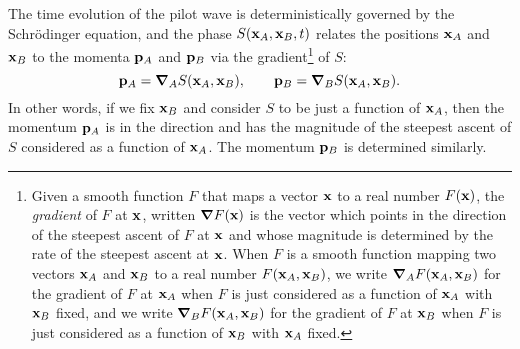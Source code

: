 The time evolution of the pilot wave is deterministically governed by the Schr\"{o}dinger equation, and the phase $S(\vb{x}_A, \vb{x}_B, t )$ relates the positions $\vb{x}_A$ and $\vb{x}_B$ to the momenta $\vb{p}_A$ and $\vb{p}_B$ via the gradient\footnote{Given a smooth function $F$ that maps a vector $\vb{x}$ to a real number $F(\vb{x})$, the \emph{gradient} of $F$ at $\vb{x}$, written $\grad F(\vb{x})$ is the vector which points in the direction of the steepest ascent of $F$ at $\vb{x}$ and whose magnitude is determined by the rate of the steepest ascent at $\vb{x}$. When $F$ is a smooth function mapping two vectors $\vb{x}_A$ and $\vb{x}_B$ to a real number $F(\vb{x}_A, \vb{x}_B)$, we write $\grad_A F(\vb{x}_A, \vb{x}_B)$ for the gradient of $F$ at $\vb{x}_A$ when $F$ is just considered as a function of $\vb{x}_A$ with $\vb{x}_B$ fixed, and we write $\grad_B F(\vb{x}_A, \vb{x}_B)$ for the gradient of $F$ at $\vb{x}_B$ when $F$ is just considered as a function of $\vb{x}_B$ with $\vb{x}_A$ fixed.} of $S$:
\begin{equation}
\vb{p}_A=\grad_A{S}(\vb{x}_A, \vb{x}_B),\qquad
\vb{p}_B=\grad_B{S}(\vb{x}_A, \vb{x}_B).
\end{equation}
In other words, %
%
if we fix $\vb{x}_B$ %
%
and consider $S$ to be just a function of $\vb{x}_A$, then the momentum $\vb{p}_A$ is in the direction and has the magnitude of the steepest ascent of $S$ considered as a function of $\vb{x}_A$. The momentum $\vb{p}_B$ is determined similarly. 

